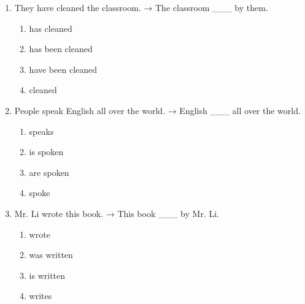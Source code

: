 \documentclass[11pt,a4paper]{ctexart}
\begin{document}
\begin{enumerate}[leftmargin=*,itemsep=4pt]
\begin{enumerate}[label=\Alph*.,leftmargin=2em,itemsep=1pt,topsep=2pt]
\item were given
\item was given
\item give
\end{enumerate}
\item They have cleaned the classroom. → The classroom \_\_\_ by them.
\begin{enumerate}[label=\Alph*.,leftmargin=2em,itemsep=1pt,topsep=2pt]
\item has cleaned
\item has been cleaned
\item have been cleaned
\item cleaned
\end{enumerate}
\item People speak English all over the world. → English \_\_\_ all over the world.
\begin{enumerate}[label=\Alph*.,leftmargin=2em,itemsep=1pt,topsep=2pt]
\item speaks
\item is spoken
\item are spoken
\item spoke
\end{enumerate}
\item Mr. Li wrote this book. → This book \_\_\_ by Mr. Li.
\begin{enumerate}[label=\Alph*.,leftmargin=2em,itemsep=1pt,topsep=2pt]
\item wrote
\item was written
\item is written
\item writes
\end{enumerate}
\end{enumerate}
\end{document}
